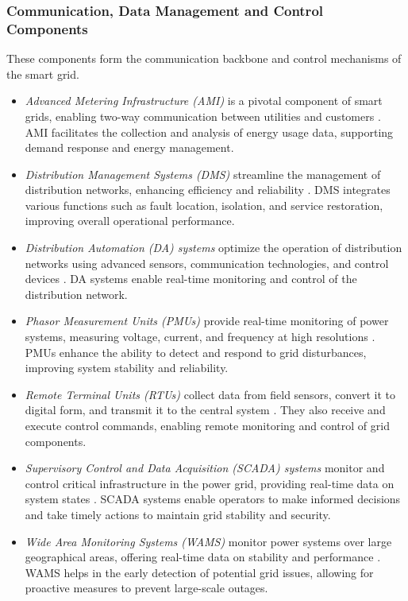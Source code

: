 \documentclass[10pt, journal]{IEEEtran}
\begin{document}
\subsubsection{Communication, Data Management and Control Components}

These components form the communication backbone and control mechanisms of the smart grid. 

\begin{itemize}

\item {\it Advanced Metering Infrastructure (AMI)} is a pivotal component of smart grids, enabling two-way communication between utilities and customers \cite{strategy2008advanced}. AMI facilitates the collection and analysis of energy usage data, supporting demand response and energy management. 

\item {\it Distribution Management Systems (DMS)} streamline the management of distribution networks, enhancing efficiency and reliability \cite{cassel1993distribution}. DMS integrates various functions such as fault location, isolation, and service restoration, improving overall operational performance.

\item {\it Distribution Automation (DA) systems} optimize the operation of distribution networks using advanced sensors, communication technologies, and control devices \cite{shirmohammadi1996distribution}. DA systems enable real-time monitoring and control of the distribution network. 

\item {\it Phasor Measurement Units (PMUs)} provide real-time monitoring of power systems, measuring voltage, current, and frequency at high resolutions \cite{wilson1994pmus}. PMUs enhance the ability to detect and respond to grid disturbances, improving system stability and reliability. 

\item {\it Remote Terminal Units (RTUs)} collect data from field sensors, convert it to digital form, and transmit it to the central system \cite{tavora1979remote}. They also receive and execute control commands, enabling remote monitoring and control of grid components.

\item {\it Supervisory Control and Data Acquisition (SCADA) systems} monitor and control critical infrastructure in the power grid, providing real-time data on system states \cite{gaushell1987supervisory}. SCADA systems enable operators to make informed decisions and take timely actions to maintain grid stability and security.

\item {\it Wide Area Monitoring Systems (WAMS)} monitor power systems over large geographical areas, offering real-time data on stability and performance \cite{mittelstadt1996doe}. WAMS helps in the early detection of potential grid issues, allowing for proactive measures to prevent large-scale outages.

\end{itemize}
\end{document}
